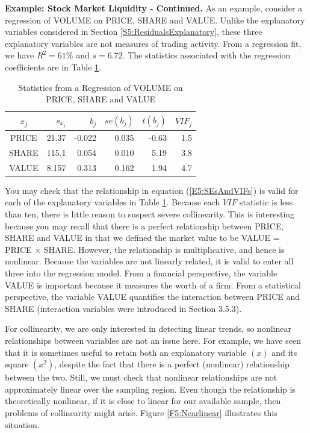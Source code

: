 \linejed{}

\textbf{Example: Stock Market Liquidity - Continued.} As an example,
consider a regression of VOLUME on PRICE, SHARE and VALUE. Unlike
the explanatory variables considered in Section
\ref{S5:ResidualsExplanatory}, these three explanatory variables are
not measures of trading activity. From a regression fit, we have
$R^2=61\%$ and $s=6.72$. The statistics associated with the
regression coefficients are in Table \ref{T5:LiquidRegression}.


\begin{table}[h]
\caption{\label{T5:LiquidRegression} Statistics from
a Regression of VOLUME on PRICE, SHARE and VALUE}

\begin{tabular}{crrrrr}
\hline
$x_j$ & $s_{x_j}$ & $b_j$ & $se(b_j)$ & $t(b_j)$ & $VIF_j$ \\
\hline PRICE& 21.37 & -0.022 & 0.035&
-0.63& 1.5 \\
SHARE & 115.1 & 0.054 & 0.010 &
5.19 & 3.8 \\
VALUE & 8.157 & 0.313 & 0.162 & 1.94 & 4.7
\\ \hline
\end{tabular}
\end{table}

You may check that the relationship in equation
(\ref{E5:SEsAndVIFs}) is valid for each of the explanatory variables
in Table \ref{T5:LiquidRegression}. Because each $VIF$ statistic is
less than ten, there is little reason to suspect severe
collinearity. This is interesting because you may recall that there
is a perfect relationship between PRICE, SHARE and VALUE in that we
defined the market value to be VALUE = PRICE $\times $ SHARE.
However, the relationship is multiplicative, and hence is nonlinear.
Because the variables are not linearly related, it is valid to enter
all three into the regression model. From a financial perspective,
the variable VALUE is important because it measures the worth of a
firm. From a statistical perspective, the variable VALUE quantifies
the interaction between PRICE and SHARE (interaction variables were
introduced in Section 3.5.3).

\linejed

For collinearity, we are only interested in detecting linear trends,
so nonlinear relationships between variables are not an issue here.
For example, we have seen that it is sometimes useful to retain both
an explanatory variable $(x)$ and its square $(x^2)$, despite the
fact that there is a perfect (nonlinear) relationship between the
two. Still, we must check that nonlinear relationships are not
approximately linear over the sampling region. Even though the
relationship is theoretically nonlinear, if it is close to linear
for our available sample, then problems of collinearity might arise.
Figure \ref{F5:Nearlinear} illustrates this situation.


